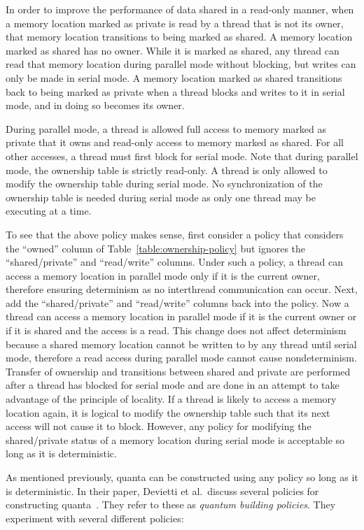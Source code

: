 In order to improve the performance of data shared in a read-only
manner, when a memory location marked as private is read by a thread
that is not its owner, that memory location transitions to being
marked as shared.  A memory location marked as shared has no owner.
While it is marked as shared, any thread can read that memory location
during parallel mode without blocking, but writes can only be made in
serial mode.  A memory location marked as shared transitions back to
being marked as private when a thread blocks and writes to it in
serial mode, and in doing so becomes its owner.

During parallel mode, a thread is allowed full access to memory marked
as private that it owns and read-only access to memory marked as
shared.  For all other accesses, a thread must first block for serial
mode.  Note that during parallel mode, the ownership table is strictly
read-only.  A thread is only allowed to modify the ownership table
during serial mode.  No synchronization of the ownership table is
needed during serial mode as only one thread may be executing at a
time.

To see that the above policy makes sense, first consider a policy that
considers the ``owned'' column of Table~\ref{table:ownership-policy}
but ignores the ``shared/private'' and ``read/write'' columns.  Under
such a policy, a thread can access a memory location in parallel mode
only if it is the current owner, therefore ensuring determinism as no
interthread communication can occur.  Next, add the ``shared/private''
and ``read/write'' columns back into the policy.  Now a thread can
access a memory location in parallel mode if it is the current owner
or if it is shared and the access is a read.  This change does not
affect determinism because a shared memory location cannot be written
to by any thread until serial mode, therefore a read access during
parallel mode cannot cause nondeterminism.  Transfer of ownership and
transitions between shared and private are performed after a thread
has blocked for serial mode and are done in an attempt to take
advantage of the principle of locality.  If a thread is likely to
access a memory location again, it is logical to modify the ownership
table such that its next access will not cause it to block.  However,
any policy for modifying the shared/private status of a memory
location during serial mode is acceptable so long as it is
deterministic.

As mentioned previously, quanta can be constructed using any policy so
long as it is deterministic.  In their paper, Devietti et al.\ discuss
several policies for constructing quanta~\cite{dmp}.  They refer to
these as \emph{quantum building policies}.  They experiment with
several different policies:

